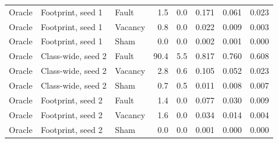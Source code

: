 \begin{tabular}{lllrrrrr}
Oracle & Footprint, seed 1 & Fault & 1.5 & 0.0 & 0.171 & 0.061 & 0.023 \\
Oracle & Footprint, seed 1 & Vacancy & 0.8 & 0.0 & 0.022 & 0.009 & 0.003 \\
Oracle & Footprint, seed 1 & Sham & 0.0 & 0.0 & 0.002 & 0.001 & 0.000 \\
Oracle & Class-wide, seed 2 & Fault & 90.4 & 5.5 & 0.817 & 0.760 & 0.608 \\
Oracle & Class-wide, seed 2 & Vacancy & 2.8 & 0.6 & 0.105 & 0.052 & 0.023 \\
Oracle & Class-wide, seed 2 & Sham & 0.7 & 0.5 & 0.011 & 0.008 & 0.007 \\
Oracle & Footprint, seed 2 & Fault & 1.4 & 0.0 & 0.077 & 0.030 & 0.009 \\
Oracle & Footprint, seed 2 & Vacancy & 1.6 & 0.0 & 0.034 & 0.014 & 0.004 \\
Oracle & Footprint, seed 2 & Sham & 0.0 & 0.0 & 0.001 & 0.000 & 0.000 \\
\bottomrule
\end{tabular}
